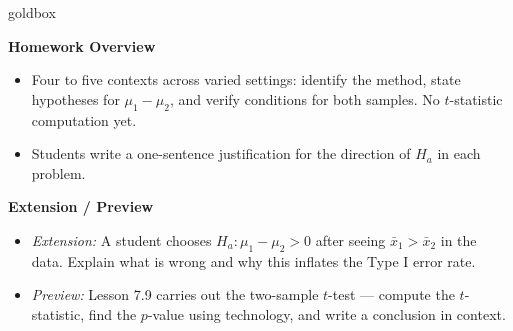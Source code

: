 \documentclass[10pt]{article}
\begin{document}
\begin{skillbox}{goldbox}
\begin{minipage}[t]{0.48\linewidth}
    \textbf{Homework Overview}
    \begin{itemize}
        \item Four to five contexts across varied settings: identify the method,
              state hypotheses for $\mu_1 - \mu_2$, and verify conditions for both
              samples. No $t$-statistic computation yet.
        \item Students write a one-sentence justification for the direction of
              $H_a$ in each problem.
    \end{itemize}
\end{minipage}
\hfill
\begin{minipage}[t]{0.48\linewidth}
    \textbf{Extension / Preview}
    \begin{itemize}
        \item \textit{Extension:} A student chooses $H_a: \mu_1 - \mu_2 > 0$
              after seeing $\bar x_1 > \bar x_2$ in the data. Explain what is
              wrong and why this inflates the Type I error rate.
        \item \textit{Preview:} Lesson 7.9 carries out the two-sample $t$-test ---
              compute the $t$-statistic, find the $p$-value using technology, and
              write a conclusion in context.
    \end{itemize}
\end{minipage}
\end{skillbox}
\end{document}

